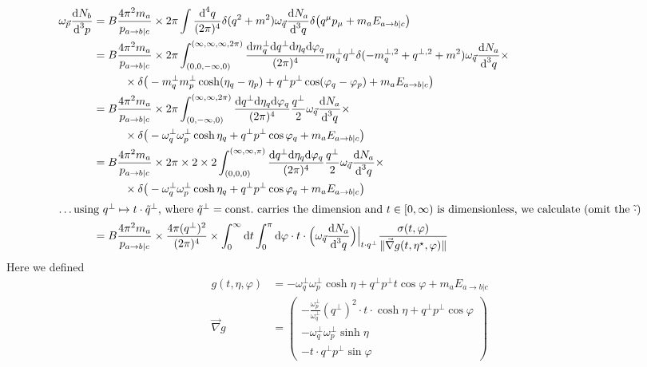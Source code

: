 \begin{subequations}
    \begin{align}
        \omega_{\vec{p}}\frac{\text{d} N_b}{\text{d}^3p}&=B\frac{4\pi^2m_a}{p_{a\rightarrow b\vert c}}\times2\pi\int\frac{\text{d}^4q}{(2\pi)^4}\delta(q^2+m^2)\omega_{\vec{q}}\frac{\text{d} N_a}{\text{d}^3 q}\delta\big(q^\mu p_\mu+m_a E_{a\rightarrow b\vert c}\big)\\
        &=B\frac{4\pi^2m_a}{p_{a\rightarrow b\vert c}}\times2\pi\int_{(0,0,-\infty,0)}^{(\infty,\infty,\infty,2\pi)}\frac{\text{d} m_q^\perp \text{d} q^\perp\text{d}\eta_q\text{d}\varphi_q}{(2\pi)^4}m_q^\perp q^\perp\delta(-m_q^{\perp,2}+q^{\perp,2}+m^2)\omega_{\vec{q}}\frac{\text{d} N_a}{\text{d}^3 q}\times\nonumber\\
        &\phantom{=}\qquad\times\delta\big(-m_q^\perp m_p^\perp\cosh(\eta_q-\eta_p)+q^\perp p^\perp\cos(\varphi_q-\varphi_p)+m_a E_{a\rightarrow b\vert c}\big)\\
        &=B\frac{4\pi^2m_a}{p_{a\rightarrow b\vert c}}\times2\pi\int_{(0,-\infty,0)}^{(\infty,\infty,2\pi)}\frac{\text{d} q^\perp\text{d}\eta_q\text{d}\varphi_q}{(2\pi)^4}\frac{q^\perp}{2}\omega_{\vec{q}}\frac{\text{d} N_a}{\text{d}^3 q}\times\nonumber\\
        &\phantom{=}\qquad\times\delta\big(-\omega_q^\perp \omega_p^\perp\cosh\eta_q+q^\perp p^\perp\cos\varphi_q+m_a E_{a\rightarrow b\vert c}\big)\\
        &=B\frac{4\pi^2m_a}{p_{a\rightarrow b\vert c}}\times2\pi\times 2\times 2\int_{(0,0,0)}^{(\infty,\infty,\pi)}\frac{\text{d} q^\perp\text{d}\eta_q\text{d}\varphi_q}{(2\pi)^4}\frac{q^\perp}{2}\omega_{\vec{q}}\frac{\text{d} N_a}{\text{d}^3 q}\times\nonumber\\
        &\phantom{=}\qquad\times\delta\big(-\omega_q^\perp \omega_p^\perp\cosh\eta_q+q^\perp p^\perp\cos\varphi_q+m_a E_{a\rightarrow b\vert c}\big)\\
        \intertext{\dots using $q^\perp\mapsto t\cdot \tilde{q}^\perp$, where $\tilde{q}^\perp={\text{const.}}$ carries the dimension and $t\in[0,\infty)$ is dimensionless, we calculate (omit the $\tilde{\cdot}$)}
        &=B\frac{4\pi^2m_a}{p_{a\rightarrow b\vert c}}\times\frac{4\pi(q^\perp)^2}{(2\pi)^4}\times\int_0^\infty\text{d} t\int_0^\pi\text{d}\varphi\cdot t\cdot \Big(\omega_{\vec{q}}\frac{\text{d} N_a}{\text{d}^3 q}\Big)\Big\vert_{t\cdot q^\perp}\frac{\sigma(t,\varphi)}{\Vert\vec{\nabla}g(t,\eta^\star,\varphi)\Vert}
    \end{align}
\end{subequations}
Here we defined
\begin{subequations}
    \begin{align}
        g(t,\eta,\varphi)&=-\omega_q^\perp \omega_p^\perp \cosh\eta+q^\perp p^\perp t\cos\varphi+m_a E_{a\rightarrow b\vert c}\\
        \vec{\nabla} g&=
        \begin{pmatrix}
            -\frac{\omega_p^\perp}{\omega_q^\perp}(q^\perp)^2 \cdot t\cdot\cosh\eta+q^\perp p^\perp \cos\varphi\\
            -\omega_q^\perp\omega_p^\perp\sinh\eta\\
            -t\cdot q^\perp p^\perp\sin\varphi
        \end{pmatrix}
    \end{align}
\end{subequations}
